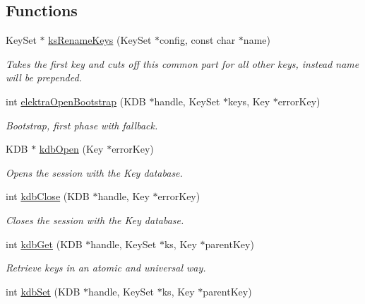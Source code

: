 \subsection*{Functions}
\begin{DoxyCompactItemize}
\item 
Key\+Set $\ast$ \hyperlink{group__kdb_ga1ba80a565f54490f362df95f401bcb29}{ks\+Rename\+Keys} (Key\+Set $\ast$config, const char $\ast$name)
\begin{DoxyCompactList}\small\item\em Takes the first key and cuts off this common part for all other keys, instead name will be prepended. \end{DoxyCompactList}\item 
\mbox{\label{group__kdb_ga5bfaad0230457cd6386032fe65c41576}} 
int \hyperlink{group__kdb_ga5bfaad0230457cd6386032fe65c41576}{elektra\+Open\+Bootstrap} (K\+DB $\ast$handle, Key\+Set $\ast$keys, Key $\ast$error\+Key)
\begin{DoxyCompactList}\small\item\em Bootstrap, first phase with fallback. \end{DoxyCompactList}\item 
K\+DB $\ast$ \hyperlink{group__kdb_ga6808defe5870f328dd17910aacbdc6ca}{kdb\+Open} (Key $\ast$error\+Key)
\begin{DoxyCompactList}\small\item\em Opens the session with the Key database. \end{DoxyCompactList}\item 
int \hyperlink{group__kdb_gadb54dc9fda17ee07deb9444df745c96f}{kdb\+Close} (K\+DB $\ast$handle, Key $\ast$error\+Key)
\begin{DoxyCompactList}\small\item\em Closes the session with the Key database. \end{DoxyCompactList}\item 
int \hyperlink{group__kdb_ga28e385fd9cb7ccfe0b2f1ed2f62453a1}{kdb\+Get} (K\+DB $\ast$handle, Key\+Set $\ast$ks, Key $\ast$parent\+Key)
\begin{DoxyCompactList}\small\item\em Retrieve keys in an atomic and universal way. \end{DoxyCompactList}\item 
int \hyperlink{group__kdb_ga11436b058408f83d303ca5e996832bcf}{kdb\+Set} (K\+DB $\ast$handle, Key\+Set $\ast$ks, Key $\ast$parent\+Key)

\end{DoxyCompactItemize}
